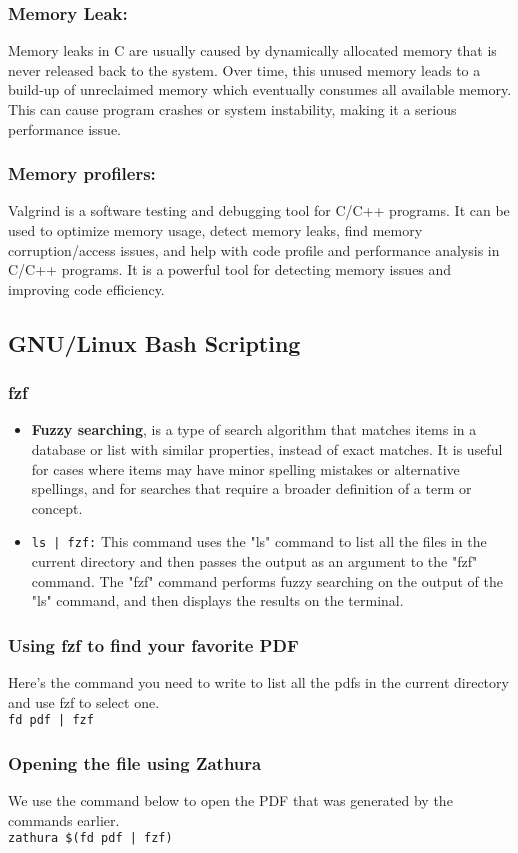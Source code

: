 \documentclass[12pt]{article}
\begin{document}
    \subsubsection{Memory Leak:}
        Memory leaks in C are usually caused by dynamically allocated memory that is never released back to the system. Over time, this unused memory leads to a build-up of unreclaimed memory which eventually consumes all available memory. This can cause program crashes or system instability, making it a serious performance issue.
    \subsubsection{Memory profilers:}
        Valgrind is a software testing and debugging tool for C/C++ programs. It can be used to optimize memory usage, detect memory leaks, find memory corruption/access issues, and help with code profile and performance analysis in C/C++ programs. It is a powerful tool for detecting memory issues and improving code efficiency.

\subsection{GNU/Linux Bash Scripting}
\subsubsection{fzf}
    \begin{itemize}
        \item \textbf{Fuzzy searching}, is a type of search algorithm that matches items in a database or list with similar properties, instead of exact matches. It is useful for cases where items may have minor spelling mistakes or alternative spellings, and for searches that require a broader definition of a term or concept. 
        \item \texttt{ls | fzf:} This command uses the "ls" command to list all the files in the current directory and then passes the output as an argument to the "fzf" command. The "fzf" command performs fuzzy searching on the output of the "ls" command, and then displays the results on the terminal.
    \end{itemize}
\subsubsection{Using fzf to find your favorite PDF}
Here's the command you need to write to list all the pdfs in the current directory and use fzf to select one.\\
\Large \texttt{fd pdf | fzf}

\subsubsection{Opening the file using Zathura}
We use the command below to open the PDF that was generated by the commands earlier.\\
\Large \texttt{zathura \$(fd pdf | fzf)}
    
\end{document}
